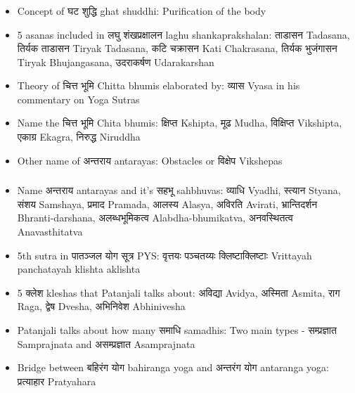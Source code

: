 \begin{frame}[fragile]\frametitle{}
\begin{itemize}
\item Concept of घट शुद्धि ghat shuddhi: Purification of the body
\item 5 asanas included in लघु शंखप्रक्षालन laghu shankaprakshalan: ताडासन Tadasana, तिर्यक ताडासन Tiryak Tadasana, कटि चक्रासन Kati Chakrasana, तिर्यक भुजंगासन Tiryak Bhujangasana, उदराकर्षण Udarakarshan
\item Theory of चित्त भूमि Chitta bhumis elaborated by: व्यास Vyasa in his commentary on Yoga Sutras
\item Name the चित्त भूमि Chita bhumis: क्षिप्त Kshipta, मूढ Mudha, विक्षिप्त Vikshipta, एकाग्र Ekagra, निरुद्ध Niruddha
\item Other name of अन्तराय antarayas: Obstacles or विक्षेप Vikshepas
\end{itemize}
\end{frame}

\begin{frame}[fragile]\frametitle{}
\begin{itemize}
\item Name अन्तराय antarayas and it's सहभू sahbhuvas: व्याधि Vyadhi, स्त्यान Styana, संशय Samshaya, प्रमाद Pramada, आलस्य Alasya, अविरति Avirati, भ्रान्तिदर्शन Bhranti-darshana, अलब्धभूमिकत्व Alabdha-bhumikatva, अनवस्थितत्व Anavasthitatva
\item 5th sutra in पातञ्जल योग सूत्र PYS: वृत्तयः पञ्चतय्यः क्लिष्टाक्लिष्टाः Vrittayah panchatayah klishta aklishta
\item 5 क्लेश kleshas that Patanjali talks about: अविद्या Avidya, अस्मिता Asmita, राग Raga, द्वेष Dvesha, अभिनिवेश Abhinivesha
\item Patanjali talks about how many समाधि samadhis: Two main types - सम्प्रज्ञात Samprajnata and असम्प्रज्ञात Asamprajnata
\item Bridge between बहिरंग योग bahiranga yoga and अन्तरंग योग antaranga yoga: प्रत्याहार Pratyahara
\end{itemize}
\end{frame}

